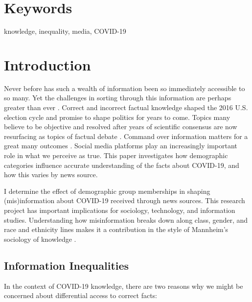 \documentclass[11pt]{article}
\begin{document}
\section{Keywords}

knowledge, inequality, media, COVID-19

\newpage

\hypertarget{introduction}{%
\section{Introduction}\label{sec:introduction}}


Never before has such a wealth of information been so immediately accessible to
so many. Yet the challenges in sorting through this information are perhaps
greater than ever \citep{Metaxa-Kakavouli2017}.
Correct and incorrect factual knowledge shaped the
2016 U.S. election cycle \citep{Allcott2017, Gunther2017} and promise to shape
politics for years to come. Topics many believe to be objective and resolved
after years of scientific consensus are now resurfacing as topics of factual
debate \citep[e.g.,][]{Hmielowski2014}. Command over information matters for a
great many outcomes \citep{Webster2006}. Social media platforms play an increasingly important role in
what we perceive as true. This paper investigates how demographic categories
influence accurate understanding of the facts about COVID-19, and how this
varies by news source.

I determine the effect of demographic group memberships in shaping
(mis)information about COVID-19 received through news sources. This research
project has important implications for sociology, technology, and information
studies. Understanding how misinformation breaks down along class, gender, and
race and ethnicity lines makes it a contribution in the style of Mannheim's
sociology of knowledge \citep{Mannheim,Swidler1994}.


\subsection{Information Inequalities}

In the context of COVID-19 knowledge, there are two reasons why we might
be concerned about differential access to correct facts:
\end{document}
